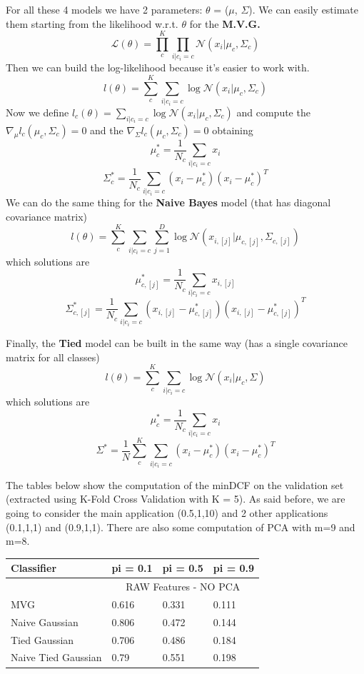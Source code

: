 \documentclass[english]{report}
\begin{document}
For all these 4 models we have 2 parameters: $\theta$ = ($\mu$, $\Sigma$). We can easily estimate them starting
from the likelihood w.r.t. $\theta$ for the \textbf{M.V.G.}
\[ \mathcal{L} (\theta) = \prod_{c}^{K}\prod_{i|c_i=c} \mathcal{N} (x_i|\mu_c,\Sigma_c)\]
Then we can build the log-likelihood because it's easier to work with.
\[ l (\theta) = \sum_{c}^{K}\sum_{i|c_i=c} \log \mathcal{N} (x_i|\mu_c,\Sigma_c)\]
Now we define \( l_c (\theta) = \sum_{i|c_i=c} \log \mathcal{N} (x_i|\mu_c,\Sigma_c)\) and compute
the $\nabla_\mu l_c(\mu_c,\Sigma_c) = 0$ and the $\nabla_\Sigma l_c(\mu_c,\Sigma_c) = 0$ 
obtaining 
\[\mu_c^* = \frac{1}{N_c}\sum_{i|c_i=c}x_i\]
\[\Sigma_c^* = \frac{1}{N_c}\sum_{i|c_i=c}(x_i-\mu_c^*)(x_i-\mu_c^*)^T\]
We can do the same thing for the \textbf{Naive Bayes} model (that has diagonal covariance matrix)
\[ l (\theta) = \sum_{c}^{K}\sum_{i|c_i=c}\sum_{j=1}^{D} \log \mathcal{N} (x_{i,[j]}|\mu_{c,[j]},\Sigma_{c,[j]})\]
which solutions are
\[\mu_{c,[j]}^* = \frac{1}{N_c}\sum_{i|c_i=c}x_{i,[j]}\] 
\[\Sigma_{c,[j]}^* = \frac{1}{N_c}\sum_{i|c_i=c}(x_{i,[j]}-\mu_{c,[j]}^*)(x_{i,[j]}-\mu_{c,[j]}^*)^T\] 

Finally, the \textbf{Tied} model can be built in the same way (has a single covariance matrix for all classes)
\[ l (\theta) = \sum_{c}^{K}\sum_{i|c_i=c} \log \mathcal{N} (x_i|\mu_c,\Sigma)\]
which solutions are
\[\mu_{c}^* = \frac{1}{N_c}\sum_{i|c_i=c}x_{i}\] 
\[\Sigma^* = \frac{1}{N}\sum_{c}^{K}\sum_{i|c_i=c}(x_{i}-\mu_{c}^*)(x_{i}-\mu_{c}^*)^T\] 

The tables below show the computation of the minDCF on the validation set (extracted using K-Fold Cross Validation with K = 5).
As said before, we are going to consider the main application (0.5,1,10) and 2 other applications (0.1,1,1) and (0.9,1,1).
There are also some computation of PCA with m=9 and m=8.

\begin{table}[H]
    \centering
    \begin{tabular}{@{}llll@{}}
    \toprule
    Classifier          & pi = 0.1  & pi = 0.5  & pi = 0.9 \\ \midrule
                        & \multicolumn{3}{c}{RAW Features - NO PCA} \\ \midrule
    MVG                 & 0.616     & 0.331     & 0.111    \\
    Naive Gaussian      & 0.806     & 0.472     & 0.144    \\
    Tied Gaussian       & 0.706     & 0.486     & 0.184    \\
    Naive Tied Gaussian & 0.79      & 0.551     & 0.198    \\ \bottomrule
    \end{tabular}
    \label{tab:MVG_RAW_valid}
\end{table}
\end{document}
